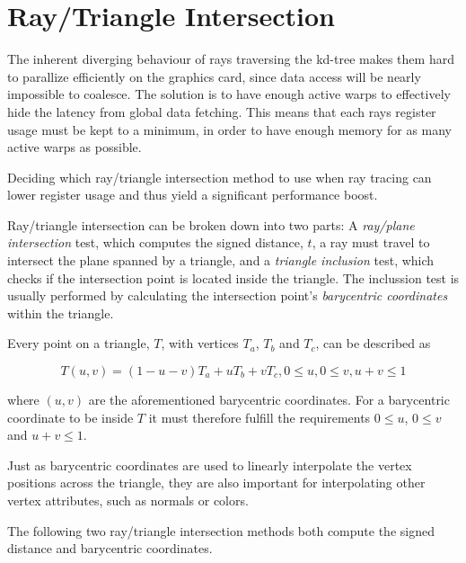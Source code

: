 \section{Ray/Triangle Intersection}\label{sec:intersection}

The inherent diverging behaviour of rays traversing the kd-tree makes them hard
to parallize efficiently on the graphics card, since data access will be nearly
impossible to coalesce. The solution is to have enough active warps to
effectively hide the latency from global data fetching. This means that each
rays register usage must be kept to a minimum, in order to have enough memory
for as many active warps as possible.

Deciding which ray/triangle intersection method to use when ray tracing can
lower register usage and thus yield a significant performance boost.


Ray/triangle intersection can be broken down into two parts: A \textit{ray/plane
  intersection} test, which computes the signed distance, $t$, a ray must travel
to intersect the plane spanned by a triangle, and a \textit{triangle inclusion}
test, which checks if the intersection point is located inside the triangle. The
inclussion test is usually performed by calculating the intersection point's
\textit{barycentric coordinates} within the triangle.

Every point on a triangle, $T$, with vertices $T_a$, $T_b$ and $T_c$, can be described
as

\begin{displaymath}
  T(u,v) = (1-u-v)T_a + uT_b + vT_c, 0 \le u, 0 \le v, u+v \le 1
\end{displaymath}
 
where $(u, v)$ are the aforementioned barycentric coordinates. For a barycentric
coordinate to be inside $T$ it must therefore fulfill the requirements $0 \le
u$, $0 \le v$ and $u+v \le 1$.

Just as barycentric coordinates are used to linearly interpolate the vertex
positions across the triangle, they are also important for interpolating other
vertex attributes, such as normals or colors.

The following two ray/triangle intersection methods both compute the signed
distance and barycentric coordinates.

